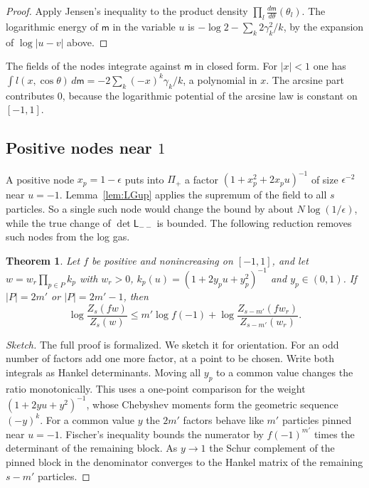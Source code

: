 \documentclass[11pt]{amsart}
\newtheorem{theorem}{Theorem}[section]
\theoremstyle{definition}
\theoremstyle{remark}
\numberwithin{equation}{section}
\begin{document}
\begin{proof}
Apply Jensen's inequality to the product density $\prod_l\frac{d\mathsf m}{d\theta}(\theta_l)$. The logarithmic
energy of $\mathsf m$ in the variable $u$ is $-\log2-\sum_k2\gamma_k^2/k$, by the expansion of $\log|u-v|$
above.
\end{proof}

The fields of the nodes integrate against $\mathsf m$ in closed form. For $|x|<1$ one has
$\int l(x,\cos\theta)\,d\mathsf m=-2\sum_k(-x)^k\gamma_k/k$, a polynomial in $x$. The arcsine part contributes
$0$, because the logarithmic potential of the arcsine law is constant on $[-1,1]$.

\subsection{Positive nodes near $1$}\label{ssec:near1}
A positive node $x_p=1-\epsilon$ puts into $\Pi_+$ a factor $(1+x_p^2+2x_pu)^{-1}$ of size $\epsilon^{-2}$ near
$u=-1$. Lemma~\ref{lem:LGup} applies the supremum of the field to all $s$ particles. So a single such node
would change the bound by about $N\log(1/\epsilon)$, while the true change of $\det\mathsf L_{--}$ is bounded.
The following reduction removes such nodes from the log gas.

\begin{theorem}\label{thm:near1}
Let $f$ be positive and nonincreasing on $[-1,1]$, and let $w=w_r\prod_{p\in P}k_p$ with $w_r>0$,
$k_p(u)=(1+2y_pu+y_p^2)^{-1}$ and $y_p\in(0,1)$. If $|P|=2m'$ or $|P|=2m'-1$, then
\[
 \log\frac{Z_s(fw)}{Z_s(w)}\le m'\log f(-1)+\log\frac{Z_{s-m'}(fw_r)}{Z_{s-m'}(w_r)} .
\]
\end{theorem}

\begin{proof}[Sketch]
The full proof is formalized. We sketch it for orientation. For an odd number of factors add one more
factor, at a point to be chosen. Write both integrals as Hankel determinants. Moving all $y_p$ to a common
value changes the ratio monotonically. This uses a one-point comparison for the weight
$(1+2yu+y^2)^{-1}$, whose Chebyshev moments form the geometric sequence $(-y)^k$. For a common value $y$ the
$2m'$ factors behave like $m'$ particles pinned near $u=-1$. Fischer's inequality bounds the numerator by
$f(-1)^{m'}$ times the determinant of the remaining block. As $y\to1$ the Schur complement of the pinned block
in the denominator converges to the Hankel matrix of the remaining $s-m'$ particles.
\end{proof}
\end{document}
